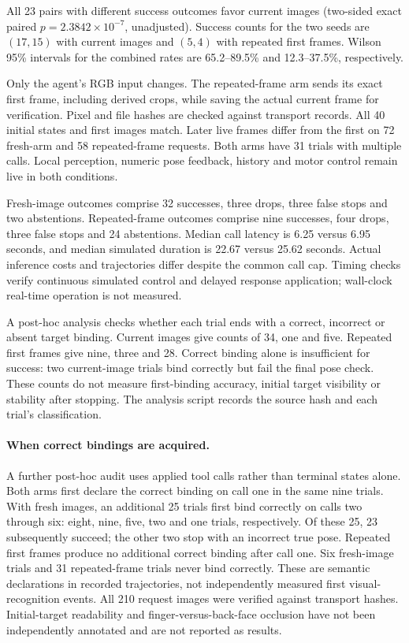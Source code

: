 All 23 pairs with different success outcomes favor current images (two-sided exact paired $p=2.3842\times10^{-7}$, unadjusted). Success counts for the two seeds are $(17,15)$ with current images and $(5,4)$ with repeated first frames. Wilson 95\% intervals for the combined rates are 65.2--89.5\% and 12.3--37.5\%, respectively.

Only the agent's RGB input changes. The repeated-frame arm sends its exact first frame, including derived crops, while saving the actual current frame for verification. Pixel and file hashes are checked against transport records. All 40 initial states and first images match. Later live frames differ from the first on 72 fresh-arm and 58 repeated-frame requests. Both arms have 31 trials with multiple calls. Local perception, numeric pose feedback, history and motor control remain live in both conditions.

Fresh-image outcomes comprise 32 successes, three drops, three false stops and two abstentions. Repeated-frame outcomes comprise nine successes, four drops, three false stops and 24 abstentions. Median call latency is 6.25 versus 6.95 seconds, and median simulated duration is 22.67 versus 25.62 seconds. Actual inference costs and trajectories differ despite the common call cap. Timing checks verify continuous simulated control and delayed response application; wall-clock real-time operation is not measured.

A post-hoc analysis checks whether each trial ends with a correct, incorrect or absent target binding. Current images give counts of 34, one and five. Repeated first frames give nine, three and 28. Correct binding alone is insufficient for success: two current-image trials bind correctly but fail the final pose check. These counts do not measure first-binding accuracy, initial target visibility or stability after stopping. The analysis script records the source hash and each trial's classification.


\paragraph{When correct bindings are acquired.}
A further post-hoc audit uses applied tool calls rather than terminal states alone. Both arms first declare the correct binding on call one in the same nine trials. With fresh images, an additional 25 trials first bind correctly on calls two through six: eight, nine, five, two and one trials, respectively. Of these 25, 23 subsequently succeed; the other two stop with an incorrect true pose. Repeated first frames produce no additional correct binding after call one. Six fresh-image trials and 31 repeated-frame trials never bind correctly. These are semantic declarations in recorded trajectories, not independently measured first visual-recognition events. All 210 request images were verified against transport hashes. Initial-target readability and finger-versus-back-face occlusion have not been independently annotated and are not reported as results.

